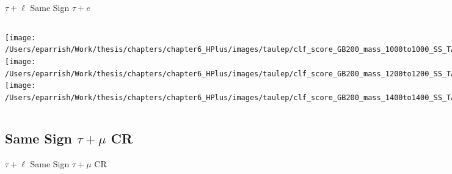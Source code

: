 \documentclass[aspectratio=169,xcolor=table]{beamer}
\begin{document}
    \begin{frame}[t]{$\tau+\ell$ Same Sign $\tau+e$}
      \begin{columns}[t]
          \texttt{[image: /Users/eparrish/Work/thesis/chapters/chapter6\_HPlus/images/taulep/clf\_score\_GB200\_mass\_1000to1000\_SS\_TAUEL.png]}
          \texttt{[image: /Users/eparrish/Work/thesis/chapters/chapter6\_HPlus/images/taulep/clf\_score\_GB200\_mass\_1200to1200\_SS\_TAUEL.png]}
          \texttt{[image: /Users/eparrish/Work/thesis/chapters/chapter6\_HPlus/images/taulep/clf\_score\_GB200\_mass\_1400to1400\_SS\_TAUEL.png]}

          \texttt{[image: /Users/eparrish/Work/thesis/chapters/chapter6\_HPlus/images/taulep/clf\_score\_GB200\_mass\_1600to1600\_SS\_TAUEL.png]}
          \texttt{[image: /Users/eparrish/Work/thesis/chapters/chapter6\_HPlus/images/taulep/clf\_score\_GB200\_mass\_1800to1800\_SS\_TAUEL.png]}
          \texttt{[image: /Users/eparrish/Work/thesis/chapters/chapter6\_HPlus/images/taulep/clf\_score\_GB200\_mass\_2000to2000\_SS\_TAUEL.png]}

          \texttt{[image: /Users/eparrish/Work/thesis/chapters/chapter6\_HPlus/images/taulep/clf\_score\_GB200\_mass\_2500to2500\_SS\_TAUEL.png]}
          \texttt{[image: /Users/eparrish/Work/thesis/chapters/chapter6\_HPlus/images/taulep/clf\_score\_GB200\_mass\_3000to3000\_SS\_TAUEL.png]}


      \end{columns}
    \end{frame}

  \subsection{Same Sign $\tau+\mu$ CR}

    \begin{frame}[c]{$\tau+\ell$ Same Sign $\tau+\mu$ CR}
      \begin{table}
      \end{table}
    \end{frame}
\end{document}
